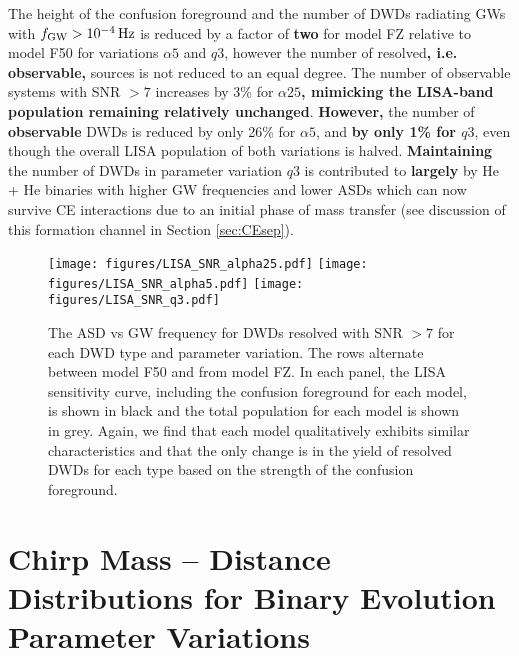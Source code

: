 \documentclass[twocolumn]{aastex631}
\begin{document}
The height of the confusion foreground and the number of DWDs radiating GWs with $f_{\rm{GW}} > 10^{-4}\,\rm{Hz}$ is reduced by a factor of \textbf{two} for model FZ relative to model F50 for variations $\alpha5$ and $q3$, however the number of resolved\textbf{, i.e. observable,} sources is not reduced to an equal degree. The number of observable systems with SNR $>7$ increases by 3\% for $\alpha25$\textbf{, mimicking the LISA-band population remaining relatively unchanged}. \textbf{However, }the number of \textbf{observable} DWDs is reduced by only 26\% for $\alpha5$, and \textbf{by only 1\% for $q3$}, even though the overall LISA population of both variations is halved. \textbf{Maintaining} the number of DWDs in parameter variation $q3$ is contributed to \textbf{largely} by He + He binaries with higher GW frequencies and lower ASDs which can now survive CE interactions due to an initial phase of mass transfer (see discussion of this formation channel in Section \ref{sec:CEsep}).

\begin{figure*}[h]
    \centering
	\texttt{[image: figures/LISA\_SNR\_alpha25.pdf]}
	\texttt{[image: figures/LISA\_SNR\_alpha5.pdf]}
	\texttt{[image: figures/LISA\_SNR\_q3.pdf]}
    \caption{The ASD vs GW frequency for DWDs resolved with SNR $> 7$ for each DWD type and parameter variation. The rows alternate between model F50 and from model FZ. In each panel, the LISA sensitivity curve, including the confusion foreground for each model, is shown in black and the total population for each model is shown in grey. Again, we find that each model qualitatively exhibits similar characteristics and that the only change is in the yield of resolved DWDs for each type based on the strength of the confusion foreground.}
    \label{fig:LISA_SNR_vars}

\end{figure*}

\section{Chirp Mass -- Distance Distributions for Binary Evolution Parameter Variations}\label{appendix:Mc_dist_vars}
\end{document}
